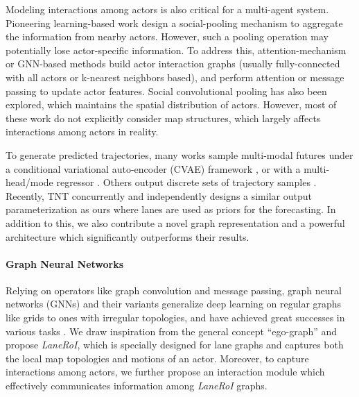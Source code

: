 Modeling interactions among actors is also critical for
a multi-agent system. Pioneering learning-based work design a social-pooling mechanism
\cite{sociallstm,socialgan} to aggregate the information from nearby actors.
However, such a 
pooling operation may potentially lose
actor-specific information. To address this,
attention-mechanism \cite{sophie,socialatt,carnet,sun2019relational} or GNN-based
methods \cite{dsd,interacttransformer,lgn,spagnn,precog,mfp,ilvm,vectornet} build actor
interaction graphs (usually fully-connected with all actors or k-nearest
neighbors based),
and perform attention or message passing to update actor features.
Social convolutional pooling \cite{matf,socialconvpool,pip} has also been explored, which maintains the spatial
distribution of actors. 
However, most of these work do not explicitly consider map structures,
which largely affects interactions among actors in reality. 

To generate predicted trajectories, many works sample multi-modal futures under a conditional variational auto-encoder (CVAE) framework
\cite{desire,r2p2,mfp,precog,ilvm}, or with a multi-head/mode regressor
\cite{lgn,cui2019multimodal,mercat2020multi,mangalam2020not,choi2019drogon}.
Others output discrete sets of
trajectory samples \cite{dsd,covernet,multipath}. Recently, TNT \cite{tnt}
concurrently and independently designs a similar output parameterization as ours
where lanes are used as priors for the forecasting. 
In addition to this, we also contribute a novel graph representation and a powerful
architecture which significantly outperforms their results.



\paragraph{Graph Neural Networks}
Relying on operators like graph convolution and message passing, graph neural
networks (GNNs) and their variants
\cite{scarselli2008graph,bruna2013spectral,li2015gated,kipf2016semi,hamilton2017inductive,ying2018hierarchical,gao2019graph}
generalize deep learning on regular graphs like grids to ones with irregular
topologies, and have achieved great successes in 
various tasks \cite{monti2017geometric,teney2017graph,li2017situation,garcia2018few}.
We draw inspiration from the general concept ``ego-graph'' and propose
\textit{LaneRoI}, which is specially designed for lane graphs and captures both
the local map topologies and motions of an actor.
Moreover, to capture interactions among actors, we further propose an
interaction module which effectively communicates information among
\textit{LaneRoI} graphs.

